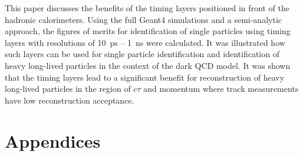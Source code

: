 \documentclass[final,1p,11pt]{elsarticle}
\begin{document}
This paper discusses the benefits of the timing layers positioned in front of the hadronic calorimeters.
Using the full Geant4 simulations and a semi-analytic approach,
the figures of merits for identification of single particles
using timing layers with resolutions of 10~ps -- 1~ns were calculated.
It was illustrated 
how such layers can be used for single particle identification and
identification of heavy long-lived particles in the context of the dark QCD model.
It was shown that the timing layers lead to a significant benefit for reconstruction of heavy long-lived particles 
in the region of $c\tau$ and momentum where track measurements have low reconstruction acceptance.

\newpage


\def\bibname{\Large\bf References}


\clearpage
\appendix
\renewcommand{\thesubsection}{\Alph{subsection}}
\section*{Appendices}

\end{document}
